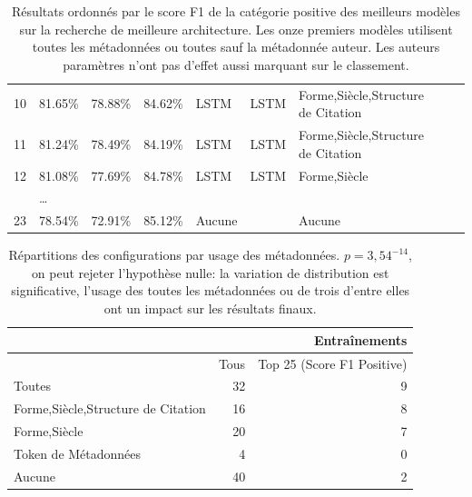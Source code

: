 \begin{table}[ht]
{\begin{tabular}{@{}lllllllll@{}}
10   & 81.65\%            & 78.88\%          & 84.62\%             & LSTM            & LSTM              & Forme,Siècle,Structure de Citation \\
11   & 81.24\%            & 78.49\%          & 84.19\%             & LSTM            & LSTM              & Forme,Siècle,Structure de Citation \\
12   & 81.08\%            & 77.69\%          & 84.78\%             & LSTM            & LSTM              & Forme,Siècle                       \\
     & …                  &                  &                     &                 &                   &                                    \\
23   & 78.54\%            & 72.91\%          & 85.12\%             & Aucune          &                   & Aucune                             \\ \bottomrule
\end{tabular}%
}
\caption{Résultats ordonnés par le score F1 de la catégorie positive des meilleurs modèles sur la recherche de meilleure architecture. Les onze premiers modèles utilisent toutes les métadonnées ou toutes sauf la métadonnée auteur. Les auteurs paramètres n'ont pas d'effet aussi marquant sur le classement.}
\label{tab:chap4:resultats-metadata}
\end{table}

\begin{table}[ht]
\centering
\begin{tabular}{l|r|r}
                                   & \multicolumn{2}{r}{Entraînements} \\ \hline
                                   & Tous & Top 25 (Score F1 Positive) \\ \hline
Toutes                             & 32   & 9                          \\
Forme,Siècle,Structure de Citation & 16   & 8                          \\
Forme,Siècle                       & 20   & 7                          \\
Token de Métadonnées               & 4    & 0                          \\
Aucune                             & 40   & 2                          \\ \hline
\end{tabular}
\caption{Répartitions des configurations par usage des métadonnées. $p=3,54^{-14}$, on peut rejeter l'hypothèse nulle: la variation de distribution est significative, l'usage des toutes les métadonnées ou de trois d'entre elles ont un impact sur les résultats finaux.}
\label{tab:chap4:metadata-p-value}
\end{table}

